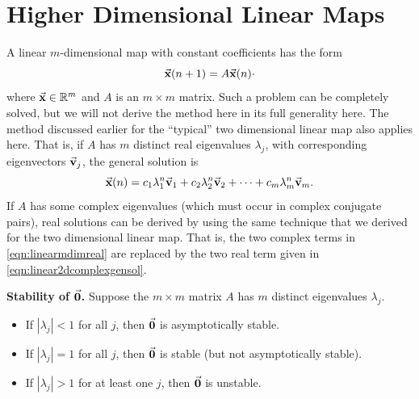 \newpage

\section{Higher Dimensional Linear Maps}
%

A linear $m$-dimensional map with constant coefficients has the form
\begin{equation}
  \vec{\textbf{x}}(n+1) = A\vec{\textbf{x}}(n)
\label{eqn:linearmapmdim}\cdot
\end{equation}
where $\vec{\textbf{x}}\in \mathbb{R}^m$ and $A$ is an $m\times m$ matrix.
Such a problem can be completely solved, but we will not
derive the method here in its full generality here.
The method discussed earlier for the
``typical'' two dimensional linear map also applies here.
That is, if $A$ has $m$ distinct real eigenvalues
$\lambda_j$, with corresponding eigenvectors
$\vec{\textbf{v}}_j$, the general solution is
\begin{equation}
   \vec{\textbf{x}}(n) = c_1 \lambda_1^n \vec{\textbf{v}}_1 + c_2 \lambda_2^n \vec{\textbf{v}}_2
                 + \cdots + c_m \lambda_m^n\vec{\textbf{v}}_m.
\label{eqn:linearmdimreal}
\end{equation}
%
If $A$ has some complex eigenvalues (which must occur in
complex conjugate pairs), real solutions can be derived
by using the same technique that we derived for the
two dimensional linear map.
That is, the two complex terms in \eqref{eqn:linearmdimreal}
are replaced by the two real term given in
\eqref{eqn:linear2dcomplexgensol}.

\medskip
\noindent
\textbf{Stability of $\vec{\textbf{0}}$.}
Suppose the $m\times m$ matrix $A$ has $m$ distinct eigenvalues $\lambda_j$.
\begin{itemize}
\item If $|\lambda_j| < 1$ for all $j$, then
$\vec{\textbf{0}}$ is asymptotically stable.
\item If $|\lambda_j| = 1$ for all $j$, then
$\vec{\textbf{0}}$ is stable (but not asymptotically stable).
\item If $|\lambda_j| > 1$ for at least one $j$,
then $\vec{\textbf{0}}$ is unstable.
\end{itemize}



